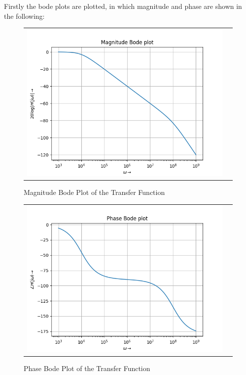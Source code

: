 \documentclass[11pt, a4paper]{article}
\begin{document}
       Firstly the bode plots are plotted, in which magnitude and phase are shown in the following:
	       \begin{figure}[H]
                    \centering
                    \setlength\tabcolsep{2pt}
                    \begin{tabular}{cc}
                       \includegraphics[scale=0.9]{Figure 5a.png}
                    \end{tabular}
                    \caption{Magnitude Bode Plot of the Transfer Function} 
                \end{figure}
	       \begin{figure}[H]
                    \centering
                    \setlength\tabcolsep{2pt}
                    \begin{tabular}{cc}
                       \includegraphics[scale=0.9]{Figure 5b.png}
                    \end{tabular}
                    \caption{Phase Bode Plot of the Transfer Function} 
                \end{figure}
                \pagebreak
                
\end{document}
